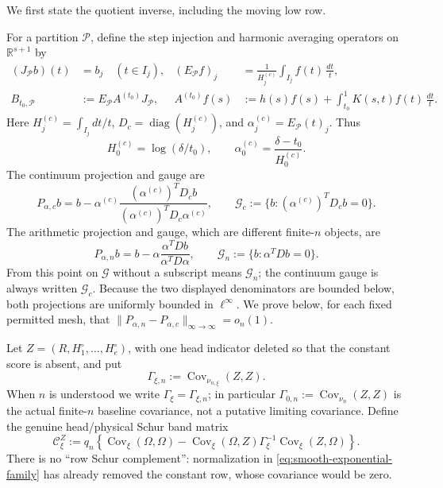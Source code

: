 \documentclass[11pt]{article}
\numberwithin{equation}{section}
\theoremstyle{definition}
\theoremstyle{remark}
\newcommand{\1}{\mathbf 1}
\begin{document}
We first state the quotient inverse, including the moving low row.

For a partition \(\mathcal P\), define the step injection and harmonic
averaging operators on \(\mathbb R^{s+1}\) by
\begin{align}
 (J_{\mathcal P}b)(t)&=b_j\quad(t\in I_j),
 & (E_{\mathcal P}f)_j&=\frac1{H_j^{(c)}}
       \int_{I_j}f(t)\,\frac{dt}{t},
 \label{eq:smooth-JE-definitions}\\
 B_{t_0,\mathcal P}&:=E_{\mathcal P}A^{(t_0)}J_{\mathcal P},
 & A^{(t_0)}f(s)&:=h(s)f(s)+
       \int_{t_0}^1K(s,t)f(t)\,\frac{dt}{t}.
 \label{eq:smooth-compressed-continuum-operator}
\end{align}
Here \(H_j^{(c)}=\int_{I_j}dt/t\),
\(D_c=\operatorname{diag}(H_j^{(c)})\), and
\(\alpha_j^{(c)}=E_{\mathcal P}(t)_j\).  Thus
\begin{equation}
 H_0^{(c)}=\log(\delta/t_0),\qquad
 \alpha_0^{(c)}=\frac{\delta-t_0}{H_0^{(c)}}.
 \label{eq:smooth-low-center}
\end{equation}
The continuum projection and gauge are
\begin{equation}
 P_{\alpha,c}b=b-\alpha^{(c)}
   \frac{(\alpha^{(c)})^TD_cb}{(\alpha^{(c)})^TD_c\alpha^{(c)}},
 \qquad \mathcal G_c:=\{b:(\alpha^{(c)})^TD_cb=0\}.
 \label{eq:smooth-continuum-gauge}
\end{equation}
The arithmetic projection and gauge, which are different finite-\(n\)
objects, are
\begin{equation}
 P_{\alpha,n}b=b-\alpha
   \frac{\alpha^TDb}{\alpha^TD\alpha},
 \qquad \mathcal G_n:=\{b:\alpha^TDb=0\}.
 \label{eq:smooth-arithmetic-gauge}
\end{equation}
From this point on \(\mathcal G\) without a subscript means
\(\mathcal G_n\); the continuum gauge is always written
\(\mathcal G_c\).
Because the two displayed denominators are bounded below, both
projections are uniformly bounded in \(\ell^\infty\).  We prove below,
for each fixed permitted mesh, that
\(\|P_{\alpha,n}-P_{\alpha,c}\|_{\infty\to\infty}=o_n(1)\).

Let \(Z=(R,H_1^\circ,\ldots,H_e^\circ)\), with one head indicator
deleted so that the constant score is absent, and put
\[
 \Gamma_{\xi,n}:=\operatorname{Cov}_{\nu_{n,\xi}}(Z,Z).
\]
When \(n\) is understood we write \(\Gamma_\xi=\Gamma_{\xi,n}\); in
particular
\(\Gamma_{0,n}:=\operatorname{Cov}_{\nu_n}(Z,Z)\) is the actual
finite-\(n\) baseline covariance, not a putative limiting covariance.
Define the genuine
head/physical Schur band matrix
\begin{equation}
 \mathcal C^Z_\xi:=q_n\left\{
  \operatorname{Cov}_\xi(\Omega,\Omega)
 -\operatorname{Cov}_\xi(\Omega,Z)\Gamma_\xi^{-1}
       \operatorname{Cov}_\xi(Z,\Omega)\right\}.
 \label{eq:smooth-joint-Schur-band-matrix}
\end{equation}
There is no ``row Schur complement'': normalization in
\eqref{eq:smooth-exponential-family} has already removed the constant
row, whose covariance would be zero.
\end{document}
